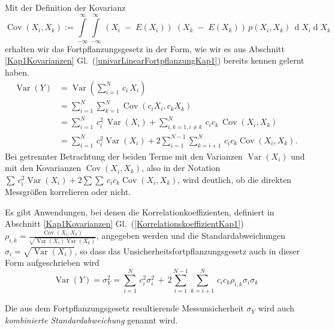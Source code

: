Mit der Definition der Kovarianz
$$
\operatorname {Cov}(X_{i},X_{k}) :=
\int\limits_{-\infty}^{\infty} \int\limits_{-\infty}^{\infty}
\, \left(X_i \; - \; E(X_i)\right) \;
      \left(X_k \; - \; E(X_k)\right) \, p(X_i, X_k)
\, \operatorname{d}X_i \operatorname{d}X_k
$$
erhalten wir das Fortpflanzungsgesetz in der Form, wie wir es aus Abschnitt \ref{Kap1Kovarianzen}
Gl.~(\ref{univarLinearFortpflanzungKap1}) bereits kennen gelernt haben.
\begin{equation}
{\begin{aligned}
\operatorname {Var}\left(Y\right) & =
\operatorname {Var}\left(\sum _{{i=1}}^{N} \, c_i \, X_{i}\right) \\
 & = \sum _{i=1}^{N}\sum _{k=1}^{N}\operatorname {Cov}(c_i X_{i}, c_k X_{k})\\
 & = \sum _{{i=1}}^{N} \, c_i^2 \, \operatorname {Var}(X_{i})+
     \sum _{{i,k=1,i\neq k}}^{N} \, c_i c_k \,  \operatorname {Cov}(X_{i},X_{k})\\
& = \sum _{{i=1}}^{N} \, c_i^2 \operatorname {Var}(X_{i})+2\sum _{{i=1}}^{{N-1}}
  \sum _{{k=i+1}}^{N} \, c_i c_k \operatorname {Cov}(X_{i},X_{k}).
\end{aligned}}
\label{univarLinearFortpflanzungKap7}
\end{equation}
Bei getrennter Betrachtung der beiden Terme mit den Varianzen $\operatorname {Var}(X_{i})$
und mit den Kovarianzen $\operatorname {Cov}(X_{i},X_{k})$, also
in der Notation $\sum \, c_i^2 \operatorname {Var}(X_{i})+2\sum
 \sum \, c_i c_k \operatorname {Cov}(X_{i},X_{k})$, wird deutlich, ob
die direkten Messgrößen korrelieren oder nicht.

Es gibt Anwendungen, bei denen die Korrelationkoeffizienten, definiert in
Abschnitt \ref{Kap1Kovarianzen} Gl.~(\ref{KorrelationskoeffizientKap1})
$\rho_{i,k} = \frac{\operatorname {Cov}(X_{i},X_{k})}{\sqrt{\operatorname {Var}(X_{i}) \operatorname {Var}(X_{k})}}$,
angegeben werden und die Standardabweichungen $\sigma_i = \sqrt{\operatorname {Var}(X_{i})}$, so dass
das Unsicherheitsfortpflanzungsgesetz auch in dieser Form aufgeschrieben wird
\begin{equation}
\operatorname {Var}\left(Y\right) = \sigma_Y^2  =
\sum _{{i=1}}^{N} \, c_i^2 \sigma_i^2 \, + \, 2\sum _{{i=1}}^{{N-1}}
  \sum _{{k=i+1}}^{N} \, c_i c_k \rho_{i,k} \sigma_i \sigma_k
\label{FortpflaKorrStd}
\end{equation}

Die aus dem Fortpflanzungsgesetz resultierende Messunsicherheit $\sigma_Y$ wird auch
\textsl{kombinierte Standardabweichung} genannt wird.


